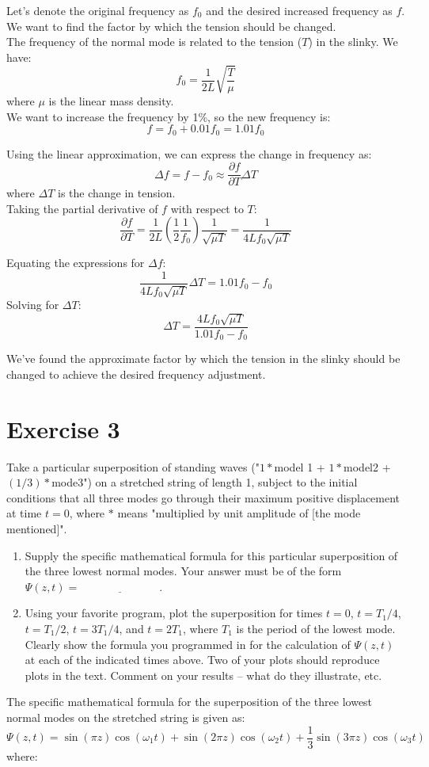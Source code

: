 \documentclass{article}
\newcommand{\pregunta}[1]{\begin{note}#1\end{note}}
\begin{document}
\noindent Let's denote the original frequency as \(f_0\) and the desired increased frequency as \(f\). We want to find the factor by which the tension should be changed.\\

\noindent The frequency of the normal mode is related to the tension (\(T\)) in the slinky. We have:
\[ f_0 = \frac{1}{2L} \sqrt{\frac{T}{\mu}} \]
where \(\mu\) is the linear mass density.\\

\noindent We want to increase the frequency by 1\%, so the new frequency is:
\[ f = f_0 + 0.01 f_0 = 1.01 f_0 \]

\noindent Using the linear approximation, we can express the change in frequency as:
\[ \Delta f = f - f_0 \approx \frac{\partial f}{\partial T} \Delta T \]
where \(\Delta T\) is the change in tension.\\

\noindent Taking the partial derivative of \(f\) with respect to \(T\):
\[ \frac{\partial f}{\partial T} = \frac{1}{2L} \left(\frac{1}{2} \frac{1}{f_0} \right) \frac{1}{\sqrt{\mu T}} = \frac{1}{4Lf_0\sqrt{\mu T}} \]

\noindent Equating the expressions for \(\Delta f\):
\[ \frac{1}{4Lf_0\sqrt{\mu T}} \Delta T = 1.01 f_0 - f_0 \]
Solving for \(\Delta T\):
\[ \Delta T = \frac{4Lf_0\sqrt{\mu T}}{1.01 f_0 - f_0} \]

\noindent We've found the approximate factor by which the tension in the slinky should be changed to achieve the desired frequency adjustment.
\clearpage

\section*{Exercise 3}
\noindent \pregunta{Take a particular superposition of standing waves ("$1*$model 1 + $1*$model2 + $(1/3)*$mode3") on a stretched string of length 1, subject to the initial conditions that all three modes go through their maximum positive displacement at time $t=0$, where $*$ means "multiplied by unit amplitude of [the mode mentioned]".
    \begin{enumerate}[label=\alph*.]
        \item Supply the specific mathematical formula for this particular superposition of the three lowest normal modes. Your answer must be of the form $\Psi(z, t) = \underline{\hspace{3cm}}$.
        \item Using your favorite program, plot the superposition for times $t=0$, $t=T_1/4$, $t = T_1/2$, $t=3T_1/4$, and $t=2T_1$, where $T_1$ is the period of the lowest mode. Clearly show the formula you programmed in for the calculation of $\Psi(z,t)$ at each of the indicated times above. Two of your plots should reproduce plots in the text. Comment on your results – what do they illustrate, etc.
    \end{enumerate}}
    \noindent The specific mathematical formula for the superposition of the three lowest normal modes on the stretched string is given as:
\[ \Psi(z, t) = \sin(\pi z) \cos(\omega_1 t) + \sin(2\pi z) \cos(\omega_2 t) + \frac{1}{3} \sin(3\pi z) \cos(\omega_3 t) \]
\noindent where:
\end{document}
